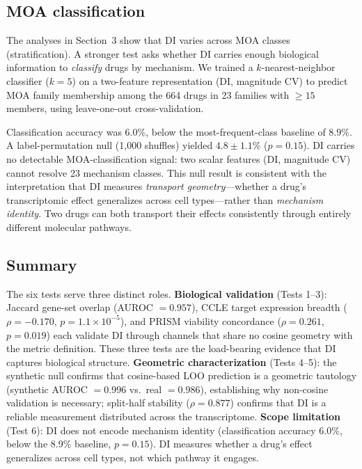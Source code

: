 \documentclass[11pt]{article}
\begin{document}
\subsection{MOA classification}

The analyses in Section~3 show that DI varies across MOA classes
(stratification).  A stronger test asks whether DI carries enough
biological information to \emph{classify} drugs by mechanism.  We
trained a $k$-nearest-neighbor classifier ($k = 5$) on a two-feature
representation (DI, magnitude CV) to predict MOA family membership
among the 664 drugs in 23 families with $\geq 15$
members, using leave-one-out cross-validation.

Classification accuracy was
$6.0\%$, below the most-frequent-class baseline of $8.9\%$.
A label-permutation null (1{,}000 shuffles) yielded
$4.8 \pm 1.1\%$ ($p = 0.15$).  DI carries no detectable
MOA-classification signal: two scalar features (DI, magnitude CV)
cannot resolve 23 mechanism classes.  This null result is consistent
with the interpretation that DI measures \emph{transport geometry}---whether
a drug's transcriptomic effect generalizes across cell types---rather
than \emph{mechanism identity}.  Two drugs can both transport their
effects consistently through entirely different molecular pathways.

\subsection{Summary}

The six tests serve three distinct roles.  \textbf{Biological
validation} (Tests 1--3): Jaccard gene-set overlap (AUROC $= 0.957$),
CCLE target expression breadth ($\rho = -0.170$, $p = 1.1 \times
10^{-5}$), and PRISM viability concordance ($\rho = 0.261$, $p =
0.019$) each validate DI through channels that share no cosine geometry
with the metric definition.  These three tests are the load-bearing
evidence that DI captures biological structure.  \textbf{Geometric
characterization} (Tests 4--5): the synthetic null confirms that
cosine-based LOO prediction is a geometric tautology (synthetic AUROC $=
0.996$ vs.\ real $= 0.986$), establishing why non-cosine validation is
necessary; split-half stability ($\rho = 0.877$) confirms that DI is a
reliable measurement distributed across the transcriptome.
\textbf{Scope limitation} (Test 6): DI does not encode mechanism
identity (classification accuracy $6.0\%$, below the $8.9\%$ baseline,
$p = 0.15$).  DI measures whether a drug's effect generalizes across
cell types, not which pathway it engages.
\end{document}
